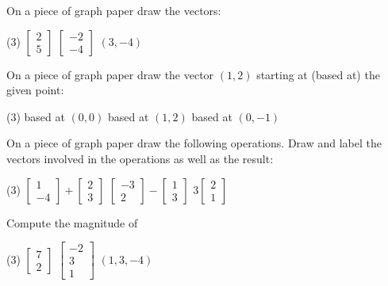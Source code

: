 \begin{exercise}
On a piece of graph paper draw the vectors:
\begin{tasks}(3)
\task
$\begin{bmatrix}
2 \\
5
\end{bmatrix}
$
\task
$\begin{bmatrix}
-2 \\
-4
\end{bmatrix}
$
\task
$(3,-4)$
\end{tasks}
\end{exercise}

\begin{exercise}
On a piece of graph paper draw the vector $(1,2)$ starting at (based at) the
given point:
\begin{tasks}(3)
\task
based at $(0,0)$
\task
based at $(1,2)$
\task
based at $(0,-1)$
\end{tasks}
\end{exercise}

\begin{exercise}
On a piece of graph paper draw the following
operations.  Draw and label the vectors involved in the operations
as well as the result:
\begin{tasks}(3)
\task
$\begin{bmatrix}
1 \\
-4
\end{bmatrix}
+
\begin{bmatrix}
2 \\
3
\end{bmatrix}$
\task
$\begin{bmatrix}
-3 \\
2
\end{bmatrix}
-
\begin{bmatrix}
1 \\
3
\end{bmatrix}$
\task
$3\begin{bmatrix}
2 \\
1
\end{bmatrix}$
\end{tasks}
\end{exercise}

\begin{exercise}
Compute the magnitude of
\begin{tasks}(3)
\task
$\begin{bmatrix}
7 \\
2
\end{bmatrix}
$
\task
$\begin{bmatrix}
-2 \\
3 \\
1
\end{bmatrix}
$
\task
$(1,3,-4)$
\end{tasks}
\end{exercise}

